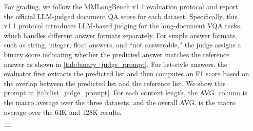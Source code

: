 \documentclass{llmxive}
\begin{document}
{{{For grading, we follow the MMLongBench v1.1 evaluation protocol and report the official LLM-judged document QA score for each dataset.
Specifically, this v1.1 protocol introduces LLM-based judging for the long-document VQA tasks, which handles different answer formats separately.
For simple answer formats, such as string, integer, float answers, and ``not answerable,'' the judge assigns a binary score indicating whether the predicted answer matches the reference answer as shown in \cref{tab:binary_judge_prompt}.
For list-style answers, the evaluator first extracts the predicted list and then computes an F1 score based on the overlap between the predicted list and the reference list. We show this prompt in \cref{tab:list_judge_prompt}.
For each context length, the AVG. column is the macro average over the three datasets, and the overall AVG. is the macro average over the 64K and 128K results.

\begin{table}[!htbp]
 \centering
 \begin{tabular}{p{0.96\linewidth}}
 \toprule
 \begin{minipage}{0.96\linewidth}
 \ttfamily\footnotesize



\end{minipage}
\end{tabular}
\end{table}}}}
\end{document}
